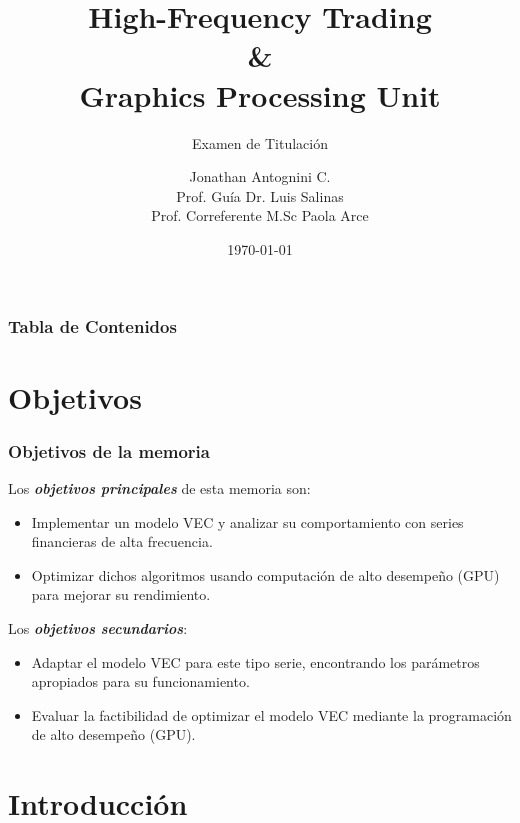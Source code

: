 \documentclass{beamer}
\title{High-Frequency Trading \\ \& \\ Graphics Processing Unit}
\subtitle{Examen de Titulación}
\author{Jonathan Antognini C.\\
		Prof. Guía Dr. Luis Salinas\\
        Prof. Correferente M.Sc Paola Arce}
\institute[UTFSM]{Universidad Técnica Federico Santa María}
\date{\today}
\begin{document}

    \frame{\titlepage}
    \begin{frame}{\contentsname}
        \frametitle{Tabla de Contenidos} 
        \begin{multicols}{2}
        \tableofcontents
        \end{multicols}
    \end{frame}

    \section{Objetivos}
        \begin{frame}
            \frametitle{Objetivos de la memoria}
            \noindent Los \emph{\textbf{objetivos principales}} de esta memoria son:
            \begin{itemize}
             \item Implementar un modelo VEC y analizar su comportamiento con
            series financieras de alta frecuencia.
             \item Optimizar dichos algoritmos usando computación de alto desempeño
            (GPU) para mejorar su rendimiento.
            \end{itemize}
            
            \noindent Los \emph{\textbf{objetivos secundarios}}:
            \begin{itemize}
                \item Adaptar el modelo VEC para este tipo serie, encontrando
            los parámetros apropiados para su funcionamiento.
                \item Evaluar la factibilidad de optimizar el modelo VEC mediante la
            programación de alto desempeño (GPU).
            \end{itemize}

        \end{frame}

    \section{Introducción}
\end{document}
